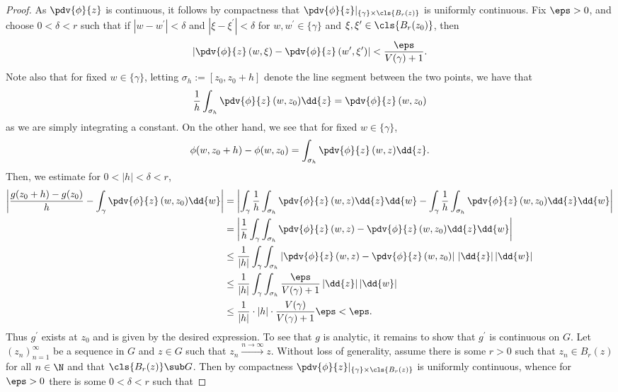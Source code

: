 \documentclass[12pt]{article}
\begin{document}
\begin{homeworkProblem}
\begin{proof}
    As $ \pdv{\phi}{z}  $ is continuous, it follows by compactness that $ \pdv{\phi}{z}\vert_{\{\gamma\}\times \cls{B_{r}(z)}} $ is uniformly continuous.  Fix $ \eps>0 $, and choose $ 0<\delta<r $ such that if $ |w-w^{\prime}|< \delta $ and $ |\xi-\xi^{\prime}|<\delta $ for $ w,w^{\prime}\in \{\gamma\} $ and $ \xi,\xi^{\prime}\in \cls{B_{r}(z_{0})} $, then 
    \[
      \left|\pdv{\phi}{z}\, (w,\xi) - \pdv{\phi}{z}\, (w^{\prime},\xi^{\prime})\right| <\frac{\eps}{V(\gamma)+1}.
    \]
    Note also that for fixed $ w\in \{\gamma\}$, letting $ \sigma_{h}:=[z_{0},z_{0}+h] $ denote the line segment between the two points, we have that 
    \[
      \frac{1}{h}\int_{\sigma_{h}} \pdv{\phi}{z}\,(w,z_{0})\dd{z} = \pdv{\phi}{z}\, (w,z_{0})
    \]
    as we are simply integrating a constant. On the other hand, we see that for fixed $ w\in \{\gamma\} $,
    \[
      \phi(w,z_{0}+h) - \phi(w,z_{0}) = \int_{\sigma_{h}} \pdv{\phi}{z}\, (w,z) \dd{z}.
    \]
    Then, we estimate for $ 0<|h|<\delta<r $,
    \begin{align*}
      \left| \frac{g(z_{0}+h)-g(z_{0})}{h} - \int_{\gamma}\pdv{\phi}{z}\,(w,z_{0})\dd{w} \right| &= \left|\int_{\gamma}\frac{1}{h} \int_{\sigma_{h}} \pdv{\phi}{z} \,(w,z)\dd{z}\dd{w}- \int_{\gamma}\frac{1}{h}\int_{\sigma_{h}}\pdv{\phi}{z}\,(w,z_{0})\dd{z}\dd{w} \right|\\
      &= \left|\frac{1}{h}\int_{\gamma}\int_{\sigma_{h}} \pdv{\phi}{z} \,(w,z) - \pdv{\phi}{z}\,(w,z_{0})\dd{z}\dd{w}\right|\\
      &\leq \frac{1}{|h|}\int_{\gamma}\int_{\sigma_{h}} \left|\pdv{\phi}{z} \,(w,z) - \pdv{\phi}{z}\,(w,z_{0})\right|\,|\dd{z}|\,|\dd{w}|\\
      &\leq \frac{1}{|h|}\int_{\gamma}\int_{\sigma_{h}} \frac{\eps}{V(\gamma)+1}\,|\dd{z}|\,|\dd{w}|\\
      &\leq \frac{1}{|h|}\cdot|h|\cdot \frac{V(\gamma)}{V(\gamma)+1} \eps < \eps.
    \end{align*}
    Thus $ g^{\prime} $ exists at $ z_{0} $ and is given by the desired expression. To see that $ g $ is analytic, it remains to show that $ g^{\prime} $ is continuous on $ G $. Let $ (z_{n})_{n=1}^{\infty} $ be a sequence in $ G $ and $ z\in G $ such that $ z_{n}\xrightarrow{n\to\infty}z $. Without loss of generality, assume there is some $ r>0 $ such that $ z_{n}\in B_{r}(z) $ for all $ n\in \N $ and that $ \cls{B_{r}(z)}\sub G $. Then by compactness $ \pdv{\phi}{z}\vert_{\{\gamma\}\times \cls{B_{r}(z)}} $  is uniformly continuous, whence for $ \eps>0 $ there is some $ 0<\delta<r $ such that

\end{proof}
\end{homeworkProblem}
\end{document}
